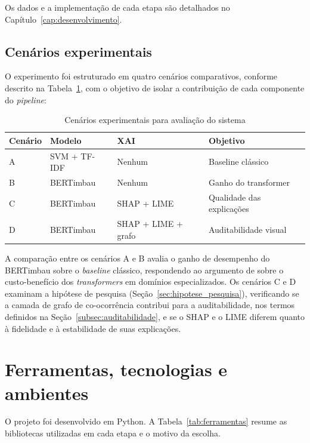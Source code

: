 \documentclass[
    12pt,                %
    openright,           %
    oneside,             %
    a4paper,             %
    english,             %
    brazil               %
]{abntex2}
\let\legendoriginal\legend
\renewcommand{\legend}[1]{\legendoriginal{\small #1}}
\begin{document}
Os dados e a implementação de cada etapa são detalhados no Capítulo~\ref{cap:desenvolvimento}.

\subsection{Cenários experimentais}
\label{subsec:experimentos}

O experimento foi estruturado em quatro cenários comparativos, conforme descrito na Tabela~\ref{tab:cenarios}, com o objetivo de isolar a contribuição de cada componente do \textit{pipeline}:

\begin{table}[H]
\centering
\caption{Cenários experimentais para avaliação do sistema}
\label{tab:cenarios}
\begin{tabular}{p{1.5cm} p{3.5cm} p{3.5cm} p{4.5cm}}
\toprule
\textbf{Cenário} & \textbf{Modelo} & \textbf{XAI} & \textbf{Objetivo} \\
\midrule
A & SVM + TF-IDF & Nenhum & Baseline clássico \\
B & BERTimbau & Nenhum & Ganho do transformer \\
C & BERTimbau & SHAP + LIME & Qualidade das explicações \\
D & BERTimbau & SHAP + LIME + grafo & Auditabilidade visual \\
\bottomrule
\end{tabular}
\legend{Fonte: Elaborado pelos autores}
\end{table}

A comparação entre os cenários A e B avalia o ganho de desempenho do BERTimbau sobre o \textit{baseline} clássico, respondendo ao argumento de 
 sobre o custo-benefício dos \textit{transformers} em domínios especializados. Os cenários C e D examinam a hipótese de pesquisa (Seção~\ref{sec:hipotese_pesquisa}), verificando se a camada de grafo de co-ocorrência contribui para a auditabilidade, nos termos definidos na Seção~\ref{subsec:auditabilidade}, e se o SHAP e o LIME diferem quanto à fidelidade e à estabilidade de suas explicações.

\section{Ferramentas, tecnologias e ambientes}
\label{sec:ferramentas}

O projeto foi desenvolvido em Python. A Tabela~\ref{tab:ferramentas} resume as bibliotecas utilizadas em cada etapa e o motivo da escolha.
\end{document}
